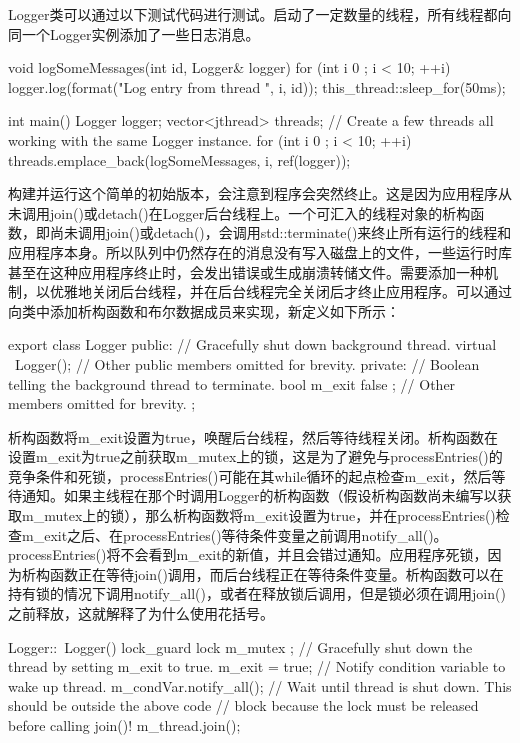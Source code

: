 Logger类可以通过以下测试代码进行测试。启动了一定数量的线程，所有线程都向同一个Logger实例添加了一些日志消息。

\begin{cpp}
void logSomeMessages(int id, Logger& logger)
{
    for (int i { 0 }; i < 10; ++i) {
        logger.log(format("Log entry {} from thread {}", i, id));
        this_thread::sleep_for(50ms);
    }
}

int main()
{
    Logger logger;
    vector<jthread> threads;
    // Create a few threads all working with the same Logger instance.
    for (int i { 0 }; i < 10; ++i) {
        threads.emplace_back(logSomeMessages, i, ref(logger));
    }
}
\end{cpp}

构建并运行这个简单的初始版本，会注意到程序会突然终止。这是因为应用程序从未调用join()或detach()在Logger后台线程上。一个可汇入的线程对象的析构函数，即尚未调用join()或detach()，会调用std::terminate()来终止所有运行的线程和应用程序本身。所以队列中仍然存在的消息没有写入磁盘上的文件，一些运行时库甚至在这种应用程序终止时，会发出错误或生成崩溃转储文件。需要添加一种机制，以优雅地关闭后台线程，并在后台线程完全关闭后才终止应用程序。可以通过向类中添加析构函数和布尔数据成员来实现，新定义如下所示：

\begin{cpp}
export class Logger
{
    public:
        // Gracefully shut down background thread.
        virtual ~Logger();
        // Other public members omitted for brevity.
    private:
        // Boolean telling the background thread to terminate.
        bool m_exit { false };
        // Other members omitted for brevity.
};
\end{cpp}

析构函数将m\_exit设置为true，唤醒后台线程，然后等待线程关闭。析构函数在设置m\_exit为true之前获取m\_mutex上的锁，这是为了避免与processEntries()的竞争条件和死锁，processEntries()可能在其while循环的起点检查m\_exit，然后等待通知。如果主线程在那个时调用Logger的析构函数（假设析构函数尚未编写以获取m\_mutex上的锁），那么析构函数将m\_exit设置为true，并在processEntries()检查m\_exit之后、在processEntries()等待条件变量之前调用notify\_all()。processEntries()将不会看到m\_exit的新值，并且会错过通知。应用程序死锁，因为析构函数正在等待join()调用，而后台线程正在等待条件变量。析构函数可以在持有锁的情况下调用notify\_all()，或者在释放锁后调用，但是锁必须在调用join()之前释放，这就解释了为什么使用花括号。

\begin{cpp}
Logger::~Logger()
{
    {
        lock_guard lock { m_mutex };
        // Gracefully shut down the thread by setting m_exit to true.
        m_exit = true;
    }
    // Notify condition variable to wake up thread.
    m_condVar.notify_all();
    // Wait until thread is shut down. This should be outside the above code
    // block because the lock must be released before calling join()!
    m_thread.join();
}
\end{cpp}

